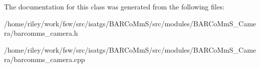 The documentation for this class was generated from the following files\+:\begin{DoxyCompactItemize}
\item 
/home/riley/work/fsw/src/isatgs/\+B\+A\+R\+Co\+Mm\+S/src/modules/\+B\+A\+R\+Co\+Mm\+S\+\_\+\+Camera/barcomms\+\_\+camera.\+h\item 
/home/riley/work/fsw/src/isatgs/\+B\+A\+R\+Co\+Mm\+S/src/modules/\+B\+A\+R\+Co\+Mm\+S\+\_\+\+Camera/barcomms\+\_\+camera.\+cpp\end{DoxyCompactItemize}

